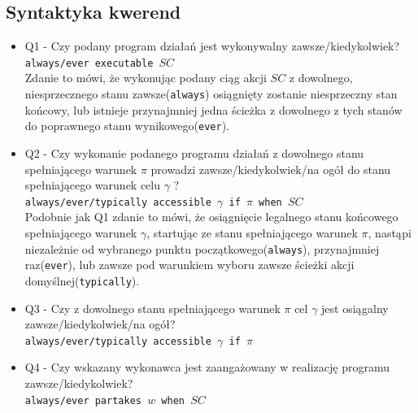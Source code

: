 \documentclass{article}
\begin{document}
\subsection{Syntaktyka kwerend}
\begin{itemize}
\item Q1 - Czy podany program działań jest wykonywalny zawsze/kiedykolwiek?\\
{\large\texttt{always/ever executable $SC$}} \\
Zdanie to mówi, że wykonując podany ciąg akcji $SC$ z dowolnego, niesprzecznego stanu zawsze(\texttt{always}) osiągnięty zostanie niesprzeczny stan końcowy, lub istnieje przynajmniej jedna ścieżka z dowolnego z tych stanów do poprawnego stanu wynikowego(\texttt{ever}).


\item Q2 - Czy wykonanie podanego programu działań z dowolnego stanu spełniającego warunek $\pi$ prowadzi zawsze/kiedykolwiek/na ogół do stanu spełniającego warunek celu $\gamma$ ?\\
{\large\texttt{always/ever/typically accessible $\gamma$ if $\pi$ when $SC$}} \\
Podobnie jak Q1 zdanie to mówi, że osiągnięcie legalnego stanu końcowego spełniającego warunek $\gamma$, startując ze stanu spełniającego warunek $\pi$, nastąpi niezależnie od wybranego punktu początkowego(\texttt{always}), przynajmniej raz(\texttt{ever}), lub zawsze pod warunkiem wyboru zawsze ścieżki akcji domyślnej(\texttt{typically}).



\item Q3 - Czy z dowolnego stanu spełniającego warunek $\pi$ cel $\gamma$ jest osiągalny zawsze/kiedykolwiek/na ogół?\\
{\large\texttt{always/ever/typically accessible $\gamma$ if $\pi$}}


\item Q4 - Czy wskazany wykonawca jest zaangażowany w realizację programu zawsze/kiedykolwiek?\\
{\large\texttt{always/ever partakes $w$ when $SC$}} \\

\end{itemize}
\end{document}
